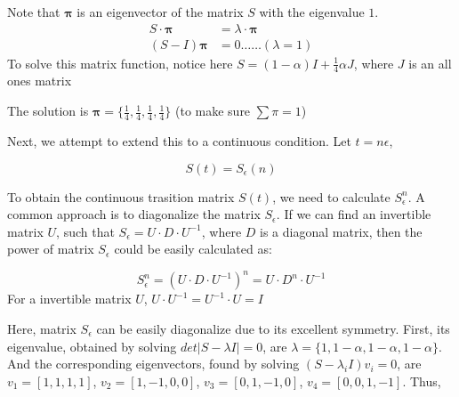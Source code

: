 \documentclass[12pt]{book}
\begin{document}
        Note that $\boldsymbol{\pi}$ is an eigenvector of the matrix $S$ with the eigenvalue $1$.
        \begin{align*}
            S \cdot \boldsymbol{\pi} &= \lambda \cdot \boldsymbol{\pi}\\
            (S-I) \boldsymbol{\pi} &= 0 \dots\dots(\lambda = 1)
        \end{align*}
        To solve this matrix function, notice here $S = (1-\alpha)I + \frac{1}{4} \alpha J$, where $J$ is an all ones matrix

        The solution is $\boldsymbol{\pi} = \{ \frac{1}{4}, \frac{1}{4}, \frac{1}{4}, \frac{1}{4} \}$ (to make sure $\sum \pi = 1$)

        Next, we attempt to extend this to a continuous condition.
        Let $t = n \epsilon$,

        \begin{equation*}
            S(t)=S_{\epsilon}(n)
        \end{equation*}

        To obtain the continuous trasition matrix $S(t)$, we need to calculate $S_{\epsilon}^n$. A common approach is to diagonalize the matrix $S_{\epsilon}$. If we can find an invertible matrix $U$, such that $S_{\epsilon} = U \cdot D \cdot U ^{-1}$, where $D$ is a diagonal matrix, then the power of matrix $S_{\epsilon}$ could be easily calculated as:

        \begin{equation*}
            S_{\epsilon}^n = (U \cdot D \cdot U ^{-1})^n = U \cdot D ^n \cdot U ^{-1}
        \end{equation*}
        For a invertible matrix $U$, $U \cdot U ^{-1} = U ^{-1} \cdot U = I$

        Here, matrix $S_{\epsilon}$ can be easily diagonalize due to its excellent symmetry. First, its eigenvalue, obtained by solving $det|S - \lambda I| = 0$, are $\lambda = \{1, 1-\alpha,1-\alpha, 1-\alpha \}$. And the corresponding eigenvectors, found by solving $(S - \lambda_i I)v_i = 0$, are $v_1 = [1,1,1,1]$, $v_2 = [1,-1,0,0]$, $v_3 = [0,1,-1,0]$, $v_4 = [0,0,1,-1]$. Thus,
\end{document}
